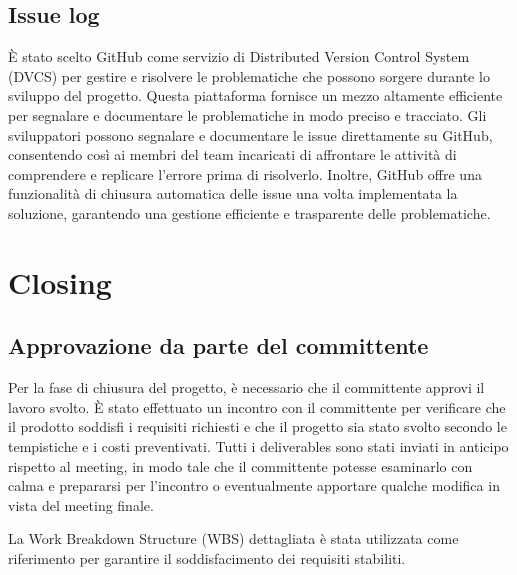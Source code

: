 \documentclass[a4paper,12pt, openright]{report}
\begin{document}
\section{Issue log}
È stato scelto GitHub come servizio di Distributed Version Control System (DVCS) per gestire e risolvere le problematiche che possono sorgere durante lo sviluppo del progetto. Questa piattaforma fornisce un mezzo altamente efficiente per segnalare e documentare le problematiche in modo preciso e tracciato.
Gli sviluppatori possono segnalare e documentare le issue direttamente su GitHub, consentendo così ai membri del team incaricati di affrontare le attività di comprendere e replicare l'errore prima di risolverlo. Inoltre, GitHub offre una funzionalità di chiusura automatica delle issue una volta implementata la soluzione, garantendo una gestione efficiente e trasparente delle problematiche.

\chapter{Closing}
\section{Approvazione da parte del committente}
Per la fase di chiusura del progetto, è necessario che il committente approvi il lavoro svolto. È stato effettuato un incontro con il committente per verificare che il prodotto soddisfi i requisiti richiesti e che il progetto sia stato svolto secondo le tempistiche e i costi preventivati. Tutti i deliverables sono stati inviati in anticipo rispetto al meeting, in modo tale che il committente potesse esaminarlo con calma e prepararsi per l'incontro o eventualmente apportare qualche modifica in vista del meeting finale.

La Work Breakdown Structure (WBS) dettagliata è stata utilizzata come riferimento per garantire il soddisfacimento dei requisiti stabiliti. 
\end{document}
